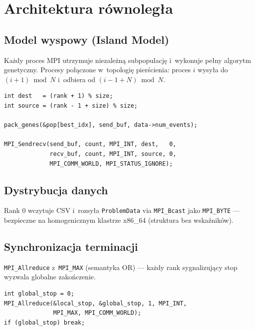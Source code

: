 \documentclass{common/sprawozdanie-agh}
\begin{document}
\section{Architektura równoległa}

\subsection{Model wyspowy (Island Model)}

Każdy proces MPI utrzymuje niezależną subpopulację i~wykonuje pełny algorytm genetyczny. Procesy połączone w~topologię pierścienia: proces $i$ wysyła do $(i+1) \bmod N$ i~odbiera od $(i-1+N) \bmod N$.

\begin{lstlisting}[style=cstyle, caption={Migracja pierścieniowa (ga.c)}]
int dest   = (rank + 1) % size;
int source = (rank - 1 + size) % size;

pack_genes(&pop[best_idx], send_buf, data->num_events);

MPI_Sendrecv(send_buf, count, MPI_INT, dest,   0,
             recv_buf, count, MPI_INT, source, 0,
             MPI_COMM_WORLD, MPI_STATUS_IGNORE);
\end{lstlisting}

\subsection{Dystrybucja danych}

Rank 0 wczytuje CSV i~rozsyła \texttt{ProblemData} via \texttt{MPI\_Bcast} jako \texttt{MPI\_BYTE} --- bezpieczne na homogenicznym klastrze x86\_64 (struktura bez wskaźników).

\subsection{Synchronizacja terminacji}

\texttt{MPI\_Allreduce} z~\texttt{MPI\_MAX} (semantyka OR) --- każdy rank sygnalizujący stop wyzwala globalne zakończenie.

\begin{lstlisting}[style=cstyle, caption={Zsynchronizowana terminacja (ga.c)}]
int global_stop = 0;
MPI_Allreduce(&local_stop, &global_stop, 1, MPI_INT,
              MPI_MAX, MPI_COMM_WORLD);
if (global_stop) break;
\end{lstlisting}
\end{document}
